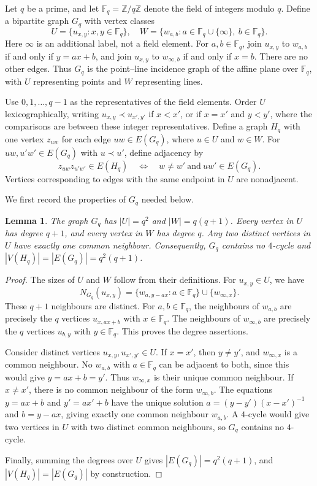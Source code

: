 \documentclass[11pt,a4paper]{article}
\newtheorem{lemma}[lemma]{Lemma}
\theoremstyle{remark}
\numberwithin{equation}{section}
\begin{document}
Let $q$ be a prime, and let $\mathbb F_q=\mathbb Z/q\mathbb Z$
denote the field of integers modulo $q$.
Define a bipartite graph $G_q$ with vertex classes
\[
	U=\{u_{x,y}:x,y\in\mathbb F_q\},\quad
	W=\{w_{a,b}:a\in\mathbb F_q\cup\{\infty\},\ b\in\mathbb F_q\}.
\]
Here $\infty$ is an additional label, not a field element.
For $a,b\in\mathbb F_q$, join $u_{x,y}$ to $w_{a,b}$ if and only
if $y=ax+b$, and join $u_{x,y}$ to $w_{\infty,b}$ if and only
if $x=b$. There are no other edges.
Thus $G_q$ is the point--line incidence graph of the affine plane
over $\mathbb F_q$, with $U$ representing points and $W$ representing
lines.

Use $0,1,\ldots,q-1$ as the representatives of the field elements.
Order $U$ lexicographically, writing $u_{x,y}\prec u_{x',y'}$
if $x<x'$, or if $x=x'$ and $y<y'$, where the comparisons are
between these integer representatives.
Define a graph $H_q$ with one vertex $z_{uw}$ for each edge
$uw\in E(G_q)$, where $u\in U$ and $w\in W$.
For $uw,u'w'\in E(G_q)$ with $u\prec u'$, define adjacency by
\begin{equation}\label{eq:affine-edge-adjacency}
	z_{uw}z_{u'w'}\in E(H_q)
	\quad\Longleftrightarrow\quad
	w\ne w'\ \text{and}\ uw'\in E(G_q).
\end{equation}
Vertices corresponding to edges with the same endpoint in $U$
are nonadjacent.

We first record the properties of $G_q$ needed below.

\begin{lemma}\label{lem:affine-base-properties}
	The graph $G_q$ has $|U|=q^2$ and $|W|=q(q+1)$.
	Every vertex in $U$ has degree $q+1$, and every vertex in $W$
	has degree $q$.
	Any two distinct vertices in $U$ have exactly one common neighbour.
	Consequently, $G_q$ contains no $4$-cycle and
	$|V(H_q)|=|E(G_q)|=q^2(q+1)$.
\end{lemma}

\begin{proof}
	The sizes of $U$ and $W$ follow from their definitions.
	For $u_{x,y}\in U$, we have
	\[
	N_{G_q}(u_{x,y})
	=\{w_{a,y-ax}:a\in\mathbb F_q\}\cup\{w_{\infty,x}\}.
	\]
	These $q+1$ neighbours are distinct.
	For $a,b\in\mathbb F_q$, the neighbours of $w_{a,b}$ are
	precisely the $q$ vertices $u_{x,ax+b}$ with $x\in\mathbb F_q$.
	The neighbours of $w_{\infty,b}$ are precisely the $q$ vertices
	$u_{b,y}$ with $y\in\mathbb F_q$.
	This proves the degree assertions.
	
	Consider distinct vertices $u_{x,y},u_{x',y'}\in U$.
	If $x=x'$, then $y\ne y'$, and $w_{\infty,x}$ is a common
	neighbour.
	No $w_{a,b}$ with $a\in\mathbb F_q$ can be adjacent to both,
	since this would give $y=ax+b=y'$.
	Thus $w_{\infty,x}$ is their unique common neighbour.
	If $x\ne x'$, there is no common neighbour of the form
	$w_{\infty,b}$.
	The equations $y=ax+b$ and $y'=ax'+b$ have the unique solution
	$a=(y-y')(x-x')^{-1}$ and $b=y-ax$, giving exactly one common
	neighbour $w_{a,b}$.
	A $4$-cycle would give two vertices in $U$ with two distinct
	common neighbours, so $G_q$ contains no $4$-cycle.
	
	Finally, summing the degrees over $U$ gives
	$|E(G_q)|=q^2(q+1)$, and $|V(H_q)|=|E(G_q)|$ by construction.
\end{proof}
\end{document}
